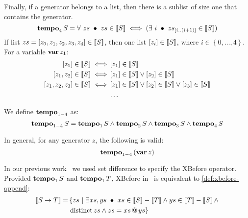 Finally, if a generator belongs to a list, then there is a sublist of size one that contains the generator.
%
\begin{equation}
\tempo[4]{S} = \forall~ zs ~\bullet~ zs \in \denote{S} \iff (\exists~ i ~\bullet~ \slice{zs}{i}{\left(i+1\right)} \in \denote{S})\label{def:tempo4}
\end{equation}
%
If list $zs=\listsin{z_0,z_1,z_2,z_3,z_4} \in \denote{S}$, then one list $\listsin{z_i} \in \denote{S}$, where $i \in \left\{0,\ldots,4\right\}$.
For a variable $\var{z_1}$:
%
%
\begin{align}
\listsin{z_1} \in \denote{S} \iff 
  & \listsin{z_1} \in \denote{S}\nonumber\\
\listsin{z_1,z_2} \in \denote{S} \iff
  & \listsin{z_1} \in \denote{S} \lor \listsin{z_2} \in \denote{S}\nonumber\\
\listsin{z_1,z_2,z_3} \in \denote{S} \iff
  & \listsin{z_1} \in \denote{S} \lor \listsin{z_2} \in \denote{S} \lor \listsin{z_3} \in \denote{S}\nonumber\\
  & \ldots\nonumber
\end{align}

We define $\tempo$ as:
\begin{equation}
\tempo{S} = \tempo[1]{S} \land \tempo[2]{S} \land \tempo[3]{S} \land \tempo[4]{S}
\end{equation}

In general, for any generator $z$, the following is valid:
%
\[
\tempo{\left(\var{z}\right)}
\]

\begin{sloppypar}
In our previous work~\cite{DM2015} we used set difference to specify the \ac{XBefore} operator.
Provided $\tempo[1]{S}$ and $\tempo[1]{T}$, \ac{XBefore} in~\cite{DM2015} is equivalent to \cref{def:xbefore-append}:
%
\begin{align}
\denote{\xbefore{S}{T}} = &\left\{ zs ~\middle|~ \exists xs, ys ~\bullet~ xs \in \denote{S}-\denote{T} \land ys \in \denote{T}-\denote{S} \land \right.\nonumber\\
& \left. \distinct{zs} \land zs = \append{xs}{ys} \right\}\label{law:old-xbefore}
\end{align}
\end{sloppypar}

